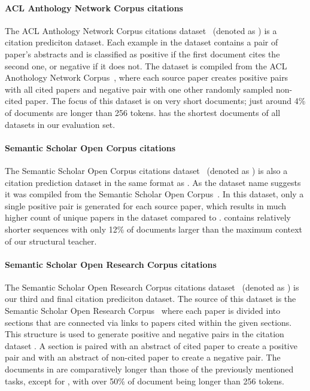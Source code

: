 \paragraph{ACL Anthology Network Corpus citations} The ACL Anthology Network
Corpus citations dataset~\citep{zhou2020multilevel} (denoted as ) is
a citation prediciton dataset. Each example in the dataset contains a pair of
paper's abstracts and is classified as positive if the first document cites the
second one, or negative if it does not. The dataset is compiled from the ACL
Anothology Network Corpus~\citep{radev2013acl}, where each source paper creates
positive pairs with all cited papers and negative pair with one other randomly
sampled non-cited paper. The focus of this dataset is on very short documents;
just around 4\% of documents are longer than 256 tokens.  has the
shortest documents of all datasets in our evaluation set.

\paragraph{Semantic Scholar Open Corpus citations} The Semantic Scholar Open
Corpus citations dataset~\citep{zhou2020multilevel} (denoted as ) is
also a citation prediction dataset in the same format as . As the
dataset name suggests it was compiled from the Semantic Scholar Open
Corpus~\citep{bhagavatula2018content}. In this dataset, only a single positive
pair is generated for each source paper, which results in much higher count of
unique papers in the dataset compared to .  contains
relatively shorter sequences with only 12\% of documents larger than the
maximum context of our structural teacher.

\paragraph{Semantic Scholar Open Research Corpus citations} The Semantic
Scholar Open Research Corpus citations dataset~\citep{zhou2020multilevel}
(denoted as ) is our third and final citation prediciton dataset.
The source of this dataset is the Semantic Scholar Open Research
Corpus~\citep{lo2019s2orc} where each paper is divided into sections that are
connected via links to papers cited within the given sections. This structure
is used to generate positive and negative pairs in the citation dataset
. A section is paired with an abstract of cited paper to create a
positive pair and with an abstract of non-cited paper to create a negative
pair. The documents in  are comparatively longer than those of the
previously mentioned tasks, except for , with over 50\% of document
being longer than 256 tokens.

